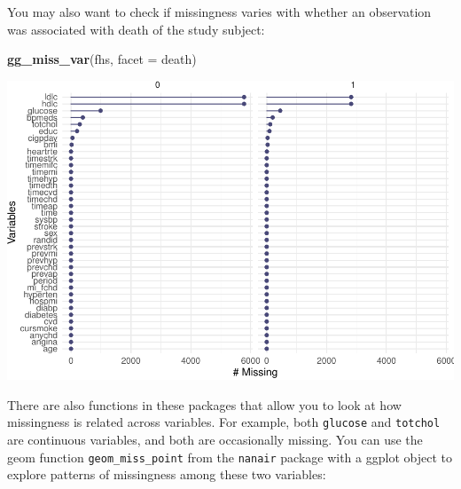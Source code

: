 \documentclass[
]{book}
\newenvironment{Shaded}{\begin{snugshade}}{\end{snugshade}}
\newcommand{\DataTypeTok}[1]{\textcolor[rgb]{0.13,0.29,0.53}{#1}}
\newcommand{\KeywordTok}[1]{\textcolor[rgb]{0.13,0.29,0.53}{\textbf{#1}}}
\newcommand{\NormalTok}[1]{#1}
\newcommand{\OperatorTok}[1]{\textcolor[rgb]{0.81,0.36,0.00}{\textbf{#1}}}
\newcommand{\StringTok}[1]{\textcolor[rgb]{0.31,0.60,0.02}{#1}}
\begin{document}
You may also want to check if missingness varies with whether an observation
was associated with death of the study subject:

\begin{Shaded}
\begin{Highlighting}[]
\KeywordTok{gg_miss_var}\NormalTok{(fhs, }\DataTypeTok{facet =}\NormalTok{ death)}
\end{Highlighting}
\end{Shaded}

\includegraphics{adv_epi_analysis_files/figure-latex/unnamed-chunk-68-1.pdf}

There are also functions in these packages that allow you to look at how
missingness is related across variables. For example, both \texttt{glucose} and
\texttt{totchol} are continuous variables, and both are occasionally missing. You
can use the geom function \texttt{geom\_miss\_point} from the \texttt{nanair} package
with a ggplot object to explore patterns of missingness among these two
variables:

\begin{Shaded}
\end{Shaded}
\end{document}

